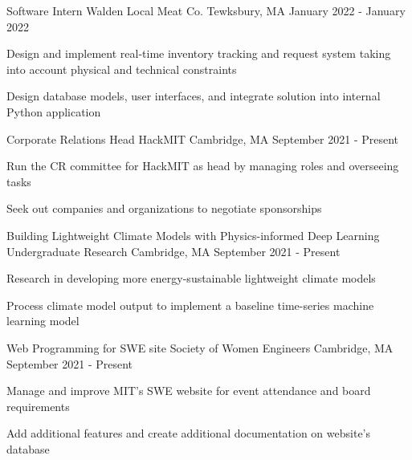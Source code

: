 \documentclass[12pt, letterpaper]{awesome-cv}
\begin{document}
\begin{cventries}
  \cventry
      {Software Intern} %
      {Walden Local Meat Co.} %
      {Tewksbury, MA} %
      {January 2022 - January 2022} %
      {
        \begin{cvitems} %
          \item {Design and implement real-time inventory tracking and request system taking into account physical and technical constraints}
          \item {Design database models, user interfaces, and integrate solution into internal Python application}
      \end{cvitems}
    }

  \cventry
    {Corporate Relations Head} %
    {HackMIT} %
    {Cambridge, MA} %
    {September 2021 - Present} %
    {
      \begin{cvitems} %
        \item {Run the CR committee for HackMIT as head by managing roles and overseeing tasks}
        \item {Seek out companies and organizations to negotiate sponsorships}
      \end{cvitems}
    }

  \cventry
    {Building Lightweight Climate Models with Physics-informed Deep Learning } %
    {Undergraduate Research} %
    {Cambridge, MA} %
    {September 2021 - Present} %
    {
      \begin{cvitems} %
        \item {Research in developing more energy-sustainable lightweight climate models}
        \item {Process climate model output to implement a baseline time-series machine learning model}
      \end{cvitems}
    }

    \cventry
    {Web Programming for SWE site} %
    {Society of Women Engineers} %
    {Cambridge, MA} %
    {September 2021 - Present} %
    {
      \begin{cvitems} %
        \item {Manage and improve MIT's SWE website for event attendance and board requirements}
        \item {Add additional features and create additional documentation on website's database}
    \end{cvitems}
    }


\end{cventries}
\end{document}
